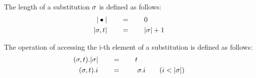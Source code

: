 \documentclass[10pt]{article}
\begin{document}
\begin{mydef}\label{def:stlcd-subst-len}
The length of a substitution $\sigma$ is defined as follows:
\begin{align*}
|\bullet| & \qquad = \qquad 0\\
|\sigma,t| & \qquad = \qquad |\sigma|+1
\end{align*}
\end{mydef}

\begin{mydef}\label{def:stlcd-subst-access}
The operation of accessing the i-th element of a substitution is
defined as follows:
\begin{align*}
(\sigma,t).|\sigma| & \qquad = \qquad t  \\
(\sigma,t).i  & \qquad = \qquad \ \sigma.i \qquad  (i < |\sigma|)
\end{align*}
\end{mydef}
\end{document}
